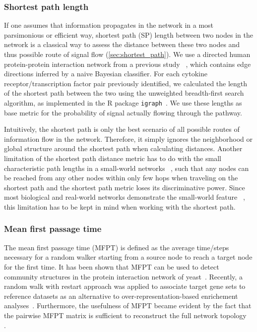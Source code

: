 \subsubsection{Shortest path length}
If one assumes that information propagates in the network in a most parsimonious
or efficient way,
shortest path (SP) length between two nodes in the network is a classical way to
assess the distance between these two nodes and thus possible route of signal flow
(\ref{sec:shortest_path}).
We use a directed human protein-protein interaction network from a previous study%
~\citep{Vinayagam2011}, which contains edge directions
inferred by a naive Bayesian classifier.
For each cytokine receptor/transcription factor pair previously identified,
we calculated the length of the shortest path between the two
using the unweighted breadth-first search algorithm,
as implemented in the R package \texttt{igraph}~\citep{Csardi2006}.
We use these lengths as base metric for the probability 
of signal actually flowing through the pathway.

Intuitively, the shortest path is only the best scenario of all possible routes
of information flow in the network. Therefore, it simply ignores the 
neighborhood or global structure around the shortest path when calculating
distances. Another limitation of the shortest path distance metric has to do
with the small characteristic path lengths in a small-world networks~%
\citep{Watts1998}, such that any nodes can be reached from any other nodes
within only few hops when traveling on the shortest path and the shortest path
metric loses its discriminative power. Since most biological
and real-world networks demonstrate the small-world feature~%
\citep{Barabasi2004}, this limitation
has to be kept in mind when working with the shortest path.

\subsubsection{Mean first passage time}
The mean first passage time (MFPT) is defined as the average time/steps 
necessary for 
a random walker starting from a source node to reach a target node for the
first time. It has been shown that MFPT can be used to detect community
structures in the protein interaction network of yeast~\citep{Zhou2003}. 
Recently, a random walk with restart approach was applied to associate
target gene sets to reference datasets as an alternative to 
over-representation-based enrichement analyses~\citep{Glaab2012}. Furthermore,
the usefulness of MFPT became evident by the fact that the pairwise MFPT 
matrix is sufficient to reconstruct the full network topology~%
\citep{Wittmann2009}.

